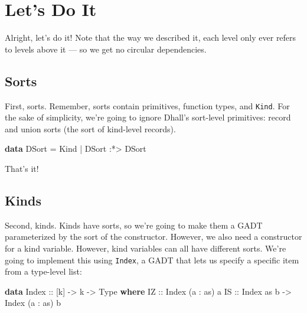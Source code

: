 \documentclass[]{article}
\newenvironment{Shaded}{}{}
\newcommand{\DataTypeTok}[1]{\textcolor[rgb]{0.56,0.13,0.00}{#1}}
\newcommand{\KeywordTok}[1]{\textcolor[rgb]{0.00,0.44,0.13}{\textbf{#1}}}
\newcommand{\NormalTok}[1]{#1}
\newcommand{\OperatorTok}[1]{\textcolor[rgb]{0.40,0.40,0.40}{#1}}
\newcommand{\OtherTok}[1]{\textcolor[rgb]{0.00,0.44,0.13}{#1}}
\begin{document}
\hypertarget{lets-do-it}{%
\section{Let's Do It}\label{lets-do-it}}

Alright, let's do it! Note that the way we described it, each level only ever
refers to levels above it --- so we get no circular dependencies.

\hypertarget{sorts}{%
\subsection{Sorts}\label{sorts}}

First, sorts. Remember, sorts contain primitives, function types, and
\texttt{Kind}. For the sake of simplicity, we're going to ignore Dhall's
sort-level primitives: record and union sorts (the sort of kind-level records).

\begin{Shaded}
\begin{Highlighting}[]
\KeywordTok{data} \DataTypeTok{DSort} \OtherTok{=} \DataTypeTok{Kind}
           \OperatorTok{|} \DataTypeTok{DSort} \OperatorTok{:*>} \DataTypeTok{DSort}
\end{Highlighting}
\end{Shaded}

That's it!

\hypertarget{kinds}{%
\subsection{Kinds}\label{kinds}}

Second, kinds. Kinds have sorts, so we're going to make them a GADT
parameterized by the sort of the constructor. However, we also need a
constructor for a kind variable. However, kind variables can all have different
sorts. We're going to implement this using \texttt{Index}, a GADT that lets us
specify a specific item from a type-level list:

\begin{Shaded}
\begin{Highlighting}[]
\KeywordTok{data} \DataTypeTok{Index}\OtherTok{ ::}\NormalTok{ [k] }\OtherTok{{-}>}\NormalTok{ k }\OtherTok{{-}>} \DataTypeTok{Type} \KeywordTok{where}
    \DataTypeTok{IZ}\OtherTok{ ::} \DataTypeTok{Index}\NormalTok{ (a \textquotesingle{}}\OperatorTok{:}\NormalTok{ as) a}
    \DataTypeTok{IS}\OtherTok{ ::} \DataTypeTok{Index}\NormalTok{ as b }\OtherTok{{-}>} \DataTypeTok{Index}\NormalTok{ (a \textquotesingle{}}\OperatorTok{:}\NormalTok{ as) b}
\end{Highlighting}
\end{Shaded}
\end{document}
